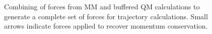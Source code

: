 \documentclass[11pt]{revtex4}
\begin{document}
\begin{figure}
  \centerline{}
  \caption{Combining of forces from MM and buffered QM calculations
           to generate a complete set of forces for trajectory calculations.
           Small arrows indicate forces applied to recover momentum
           conservation.}
  \label{fig:buffered_hybrid_diagram}
\end{figure}
\end{document}
